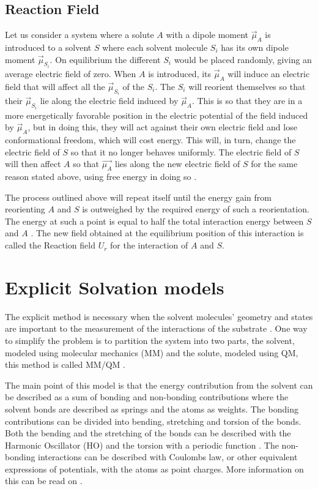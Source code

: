 \documentclass[../master_thesis.tex]{subfiles}
\begin{document}
\subsection{Reaction Field}\label{Reaction_field}
Let us consider a system where a solute $A$ with a dipole moment $\vec{\mu}_A$ is
introduced to a solvent $S$ where each solvent molecule $S_i$ has its own dipole
moment $\vec{\mu}_{S_i}$. On equilibrium the different $S_i$  would be placed
randomly, giving an average electric field of zero. When $A$ is introduced, its
$\vec{\mu}_A$ will induce an electric field that will affect all the
$\vec{\mu}_{S_i}$ of the $S_i$. The $S_i$ will reorient themselves so that their
$\vec{\mu}_{S_i}$ lie along the electric field induced by $\vec{\mu}_A$. This is
so that they are in a more energetically favorable position in the electric
potential of the field induced by $\vec{\mu}_A$, but in doing this, they will
act against their own electric field and lose conformational freedom, which will
cost energy. This will, in turn, change the electric field of $S$ so that it no
longer behaves uniformly. The electric field of $S$ will then affect $A$ so that
$\vec{\mu_A}$ lies along the new electric field of $S$ for the same reason
stated above, using free energy in doing so \cite{Cramer:2004}.

The process outlined above will repeat itself until the energy gain from
reorienting $A$ and $S$ is outweighed by the required energy of such a
reorientation. The energy at such a point is equal to half the total interaction
energy between $S$ and $A$ \cite{Cramer:2004}. The new field obtained at the
equilibrium position of this interaction is called the Reaction field $U_r$ for
the interaction of $A$ and $S$.

\section{Explicit Solvation models}

The explicit method is necessary when the solvent molecules' geometry and states
are important to the measurement of the interactions of the substrate
\cite{Cramer:2004}.
One way to simplify the problem is to partition the system into two parts, the
solvent, modeled using molecular mechanics (MM) and the solute, modeled using
\ac{QM}, this method is called MM/QM \cite{Mennucci:2018}.

The main point of this model is that the energy contribution from the solvent
can be described as a sum of bonding and non-bonding contributions
\cite{Cramer:2004} where the solvent bonds are described as springs
\cite{Mennucci:2018} and the atoms as weights. The bonding contributions can be
divided into bending, stretching and torsion of the bonds. Both the bending
and the stretching of the bonds can be described with the Harmonic Oscillator
(HO) and the torsion with a periodic function \cite{Mennucci:2018}. The
non-bonding interactions can be described with Coulombs law, or other equivalent
expressions of potentials, with the atoms as point charges. More information on
this can be read on \cite{Cramer:2004, Jensen:2017}.
\end{document}
